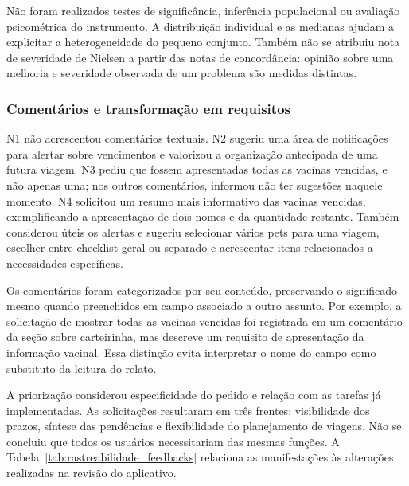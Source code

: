 Não foram realizados testes de significância, inferência populacional ou avaliação psicométrica do instrumento. A distribuição individual e as medianas ajudam a explicitar a heterogeneidade do pequeno conjunto. Também não se atribuiu nota de severidade de Nielsen a partir das notas de concordância: opinião sobre uma melhoria e severidade observada de um problema são medidas distintas.

\subsubsection{Comentários e transformação em requisitos}

N1 não acrescentou comentários textuais. N2 sugeriu uma área de notificações para alertar sobre vencimentos e valorizou a organização antecipada de uma futura viagem. N3 pediu que fossem apresentadas todas as vacinas vencidas, e não apenas uma; nos outros comentários, informou não ter sugestões naquele momento. N4 solicitou um resumo mais informativo das vacinas vencidas, exemplificando a apresentação de dois nomes e da quantidade restante. Também considerou úteis os alertas e sugeriu selecionar vários pets para uma viagem, escolher entre checklist geral ou separado e acrescentar itens relacionados a necessidades específicas.

Os comentários foram categorizados por seu conteúdo, preservando o significado mesmo quando preenchidos em campo associado a outro assunto. Por exemplo, a solicitação de mostrar todas as vacinas vencidas foi registrada em um comentário da seção sobre carteirinha, mas descreve um requisito de apresentação da informação vacinal. Essa distinção evita interpretar o nome do campo como substituto da leitura do relato.

A priorização considerou especificidade do pedido e relação com as tarefas já implementadas. As solicitações resultaram em três frentes: visibilidade dos prazos, síntese das pendências e flexibilidade do planejamento de viagens. Não se concluiu que todos os usuários necessitariam das mesmas funções. A Tabela~\ref{tab:rastreabilidade_feedbacks} relaciona as manifestações às alterações realizadas na revisão do aplicativo.

